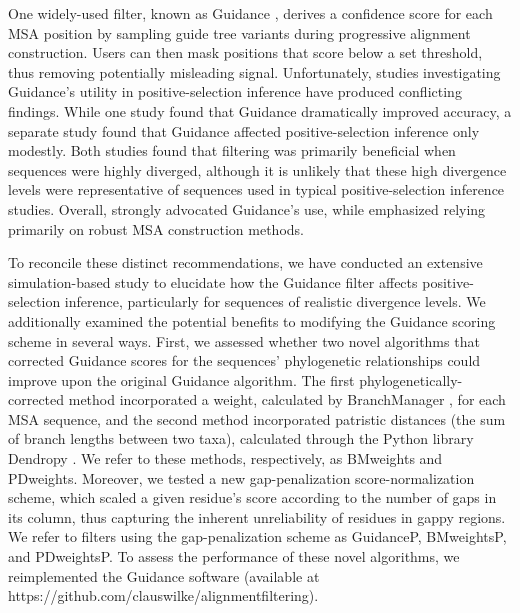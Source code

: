 \documentclass[11pt]{article}
\begin{document}
One widely-used filter, known as Guidance \citep{Penn2010}, derives a confidence score for each MSA position by sampling guide tree variants during progressive alignment construction. Users can then mask positions that score below a set threshold, thus removing potentially misleading signal. Unfortunately, studies investigating Guidance's utility in positive-selection inference have produced conflicting findings. While one study \citep{Privman2012} found that Guidance dramatically improved accuracy, a separate study \citep{Jordan2012} found that Guidance affected positive-selection inference only modestly. Both studies found that filtering was primarily beneficial when sequences were highly diverged, although it is unlikely that these high divergence levels were representative of sequences used in typical positive-selection inference studies. Overall, \citet{Privman2012} strongly advocated Guidance's use, while \citet{Jordan2012} emphasized relying primarily on robust MSA construction methods. 

To reconcile these distinct recommendations, we have conducted an extensive simulation-based study to elucidate how the Guidance filter affects positive-selection inference, particularly for sequences of realistic divergence levels. We additionally examined the potential benefits to modifying the Guidance scoring scheme in several ways.  First, we assessed whether two novel algorithms that corrected Guidance scores for the sequences' phylogenetic relationships could improve upon the original Guidance algorithm. The first phylogenetically-corrected method incorporated a weight, calculated by BranchManager \citep{Stone2007}, for each MSA sequence, and the second method incorporated patristic distances (the sum of branch lengths between two taxa), calculated through the Python library Dendropy \citep{Sukumaran2010}. We refer to these methods, respectively, as BMweights and PDweights. Moreover, we tested a new gap-penalization score-normalization scheme, which scaled a given residue's score according to the number of gaps in its column, thus capturing the inherent unreliability of residues in gappy regions. We refer to filters using the gap-penalization scheme as GuidanceP, BMweightsP, and PDweightsP. To assess the performance of these novel algorithms, we reimplemented the Guidance software (available at https://github.com/clauswilke/alignment\underline{\hspace*{0.2cm}}filtering). 
\end{document}
